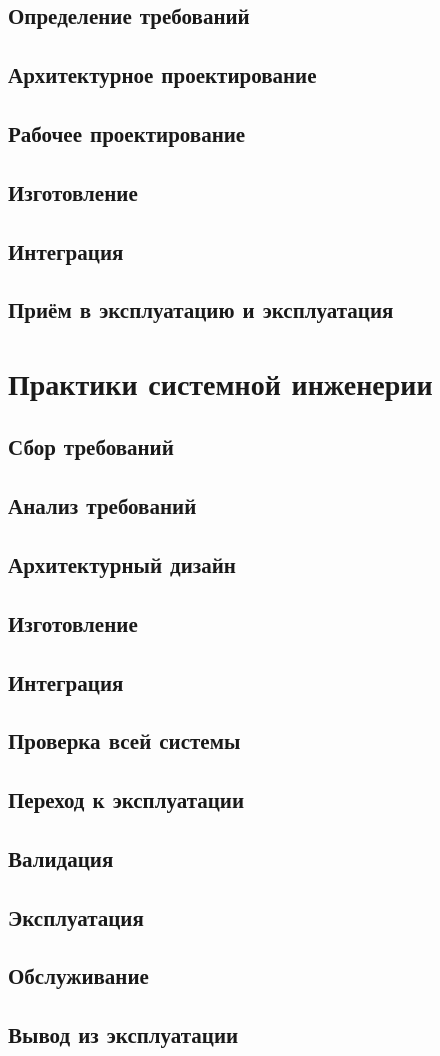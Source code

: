 \documentclass[bibliography=totocnumbered]{scrartcl}
\begin{document}
\subsection{Определение требований}
\subsection{Архитектурное проектирование}
\subsection{Рабочее проектирование}
\subsection{Изготовление}
\subsection{Интеграция}
\subsection{Приём в эксплуатацию и эксплуатация}

\section{Практики системной инженерии}

\subsection{Сбор требований}
\subsection{Анализ требований}
\subsection{Архитектурный дизайн}
\subsection{Изготовление}
\subsection{Интеграция}
\subsection{Проверка всей системы}
\subsection{Переход к эксплуатации}
\subsection{Валидация}
\subsection{Эксплуатация}
\subsection{Обслуживание}
\subsection{Вывод из эксплуатации}
\end{document}
